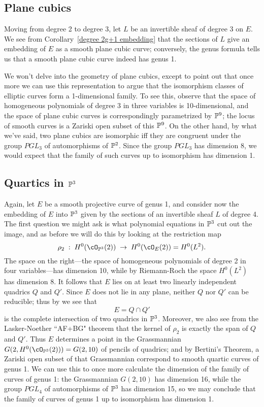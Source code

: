 \subsection{Plane cubics}

Moving from degree 2 to degree 3, let $L$ be an invertible sheaf of degree 3 on $E$. We see from Corollary~\ref{degree 2g+1 embedding} that the sections of $L$ give an embedding of $E$ as a smooth plane cubic curve; conversely, the genus formula tells us that a smooth plane cubic curve indeed has genus 1. 

We won't delve into the geometry of plane cubics, except to point out that once more we can use this representation to argue that the isomorphism classes of elliptic curves form a 1-dimensional family. To see this, observe that the space of homogeneous polynomials of degree 3 in three variables is 10-dimensional, and the space of plane cubic curves is correspondingly parametrized by  $\PP^9$; the locus of smooth curves is a Zariski open subset of this $\PP^9$. On the other hand, by what we've said, two plane cubics are isomorphic iff they are congruent under the group $PGL_3$ of automorphisms of $\PP^2$. Since the group $PGL_3$ has dimension 8, we would expect that the family of such curves up to isomorphism has dimension 1.

\subsection{Quartics in $\PP^3$} 

Again, let $E$ be a smooth projective curve of genus 1, and consider now the embedding of $E$ into $\PP^3$ given by the sections of an invertible sheaf $L$ of degree 4. The first question we might ask is what polynomial equations in $\PP^3$ cut out the image, and as before we will do this by looking at the restriction map
$$
\rho_2 \;  : \; H^0(\cO_{\PP^3}(2)) \; \to \; H^0(\cO_{E}(2)) = H^0(L^2).
$$
The space on the right---the space of homogeneous polynomials of degree 2 in four variables---has dimension 10, while by Riemann-Roch the space $H^0(L^2)$ has dimension 8. It follows that $E$ lies on at least two linearly independent quadrics $Q$ and $Q'$. Since $E$ does not lie in any plane, neither $Q$ nor $Q'$ can be reducible; thus by \bt we see that
$$
E = Q \cap Q'
$$
is the complete intersection of two quadrics in $\PP^3$. Moreover, we also see from the Lasker-Noether ``AF+BG" theorem that the kernel of $\rho_2$ is exactly the span of $Q$ and $Q'$. Thus $E$ determines a point in the Grassmannian $G(2, H^0(\cO_{\PP^3}(2))) = G(2, 10)$ of pencils of quadrics; and by Bertini's Theorem, a Zariski open subset of that Grassmannian correspond to smooth quartic curves of genus 1. We can use this to once more calculate the dimension of the family of curves of genus 1: the Grassmannian $G(2,10)$ has dimension 16, while the group $PGL_4$ of automorphisms of $\PP^3$ has dimension 15, so we may conclude that the family of curves of genus 1 up to isomorphism has dimension 1.

